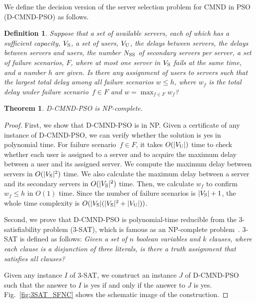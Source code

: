 \documentclass[10pt, letterpaper]{IEEEtran}
\newtheorem{thm}{Theorem} %
\newtheorem{definition}{Definition}
\begin{document}
\begin{CJK}{UTF8}{ipxm}
We define the decision version of the server selection problem for CMND in PSO (D-CMND-PSO) as follows.
\begin{definition}
    Suppose that a set of available servers, each of which has a sufficient capacity, $V_{\rm{S}}$, a set of users, $V_{\rm{U}}$, the delays between servers, the delays between servers and users, the number $N_{\rm{SS}}$ of secondary servers per server,
    a set of failure scenarios, $F$, where at most one server in $V_{\rm{S}}$ fails at the same time, and a number $h$ are given.
    Is there any assignment of users to servers such that the largest total delay among all failure scenarios $w \leq h$, 
    where $w_f$ is the total delay under failure scenario~$f \in F$ and $w = \max_{f \in F} w_f$?
\end{definition}
\begin{thm}
D-CMND-PSO is NP-complete.
\end{thm}
\begin{proof}
  First, we show that D-CMND-PSO is in NP.
  Given a certificate of any instance of D-CMND-PSO, we can verify whether the solution is yes in polynomial time.  %
  For failure scenario~$f \in F$, it takes $O(|V_{\rm{U}}|)$ time to check whether each user is assigned to a server and to acquire the maximum delay between a user and its assigned server.
  We compute the maximum delay between servers in $O(|V_{\rm{S}}|^2)$ time.
  We also calculate the maximum delay between a server and its secondary servers in $O(|V_{\rm{S}}|^2)$ time.
  Then, we calculate $w_f$ to confirm $w_f \leq h$ in $O(1)$ time.
  Since the number of failure scenarios is $|V_{\rm{S}}|+1$, the whole time complexity is $O(|V_{\rm{S}}|(|V_{\rm{S}}|^2+|V_{\rm{U}}|))$.

  Second, we prove that D-CMND-PSO is polynomial-time reducible from the 3-satisfiability problem (3-SAT), which is famous as an NP-complete problem~\cite{3_12_3SAT}. 
  3-SAT is defined as follows:
  {\it Given a set of $n$ boolean variables and $k$ clauses, where each clause is a disjunction of three literals, is there a truth assignment that satisfies all clauses?}

  Given any instance $I$ of 3-SAT, we construct an instance $J$ of D-CMND-PSO such that the answer to $I$ is yes if and only if the answer to $J$ is yes. %
  Fig.~\ref{fig:3SAT_SFNC} shows the schematic image of the construction.


\end{proof}
\end{CJK}
\end{document}

